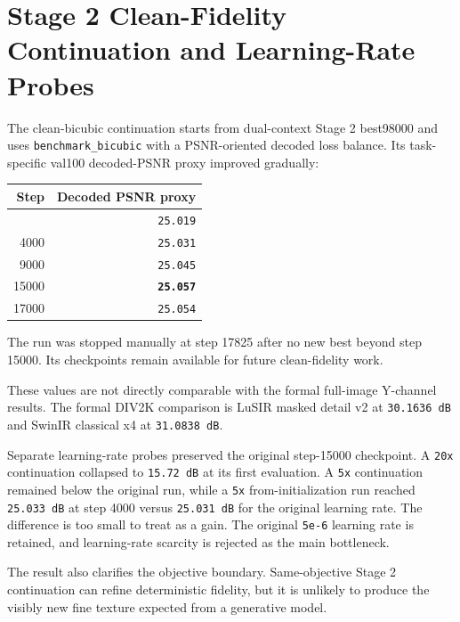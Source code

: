 \documentclass[
  10pt,
]{article}
\begin{document}
\hypertarget{stage-2-clean-fidelity-continuation-and-learning-rate-probes}{%
\section{Stage 2 Clean-Fidelity Continuation and Learning-Rate
Probes}\label{stage-2-clean-fidelity-continuation-and-learning-rate-probes}}

The clean-bicubic continuation starts from dual-context Stage 2
best98000 and uses \texttt{benchmark\_bicubic} with a PSNR-oriented
decoded loss balance. Its task-specific val100 decoded-PSNR proxy
improved gradually:

\begin{longtable}[]{@{}rr@{}}
\toprule\noalign{}
Step & Decoded PSNR proxy \\
\midrule\noalign{}
\endhead
\bottomrule\noalign{}
\endlastfoot
1000 & \texttt{25.019} \\
4000 & \texttt{25.031} \\
9000 & \texttt{25.045} \\
15000 & \textbf{\texttt{25.057}} \\
17000 & \texttt{25.054} \\
\end{longtable}

The run was stopped manually at step 17825 after no new best beyond step
15000. Its checkpoints remain available for future clean-fidelity work.

These values are not directly comparable with the formal full-image
Y-channel results. The formal DIV2K comparison is LuSIR masked detail v2
at \texttt{30.1636\ dB} and SwinIR classical x4 at \texttt{31.0838\ dB}.

Separate learning-rate probes preserved the original step-15000
checkpoint. A \texttt{20x} continuation collapsed to \texttt{15.72\ dB}
at its first evaluation. A \texttt{5x} continuation remained below the
original run, while a \texttt{5x} from-initialization run reached
\texttt{25.033\ dB} at step 4000 versus \texttt{25.031\ dB} for the
original learning rate. The difference is too small to treat as a gain.
The original \texttt{5e-6} learning rate is retained, and learning-rate
scarcity is rejected as the main bottleneck.

The result also clarifies the objective boundary. Same-objective Stage 2
continuation can refine deterministic fidelity, but it is unlikely to
produce the visibly new fine texture expected from a generative model.
\end{document}
